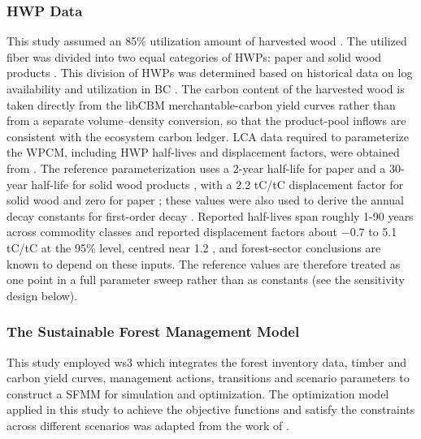 \documentclass[preprint,12pt,authoryear]{elsarticle}
\begin{document}
\begin{linenumbers}
\subsubsection{HWP Data}
This study assumed an 85\% utilization amount of harvested wood \citep{smyth2020climate}. The utilized fiber was divided into two equal categories of \acp{HWP}: paper and solid wood products \citep{ipcc2019refinement}. This division of \acp{HWP} was determined based on historical data on log availability and utilization in \ac{BC} \cite{BC_Mill_List_2020}. The carbon content of the harvested wood is taken directly from the libCBM merchantable-carbon yield curves rather than from a separate volume--density conversion, so that the product-pool inflows are consistent with the ecosystem carbon ledger. 
\Ac{LCA} data required to parameterize the \ac{WPCM}, including \ac{HWP} half-lives and displacement factors, were obtained from \cite{smyth2020climate}. The reference parameterization uses a 2-year half-life for paper and a 30-year half-life for solid wood products \citep{eggleston2006ipcc}, with a 2.2 tC/tC displacement factor for solid wood and zero for paper \citep{smyth2020climate}; these values were also used to derive the annual decay constants for first-order decay \citep{eggleston2006ipcc}. Reported half-lives span roughly 1-90 years across commodity classes \citep{ipcc2019refinement} and reported displacement factors about $-0.7$ to 5.1 tC/tC at the 95\% level, centred near 1.2 \citep{leskinen2018}, and forest-sector conclusions are known to depend on these inputs. The reference values are therefore treated as one point in a full parameter sweep rather than as constants (see the sensitivity design below).

\subsubsection{The Sustainable Forest Management Model}
\label{sec: modeling}
This study employed \ac{ws3} which integrates the forest inventory data, timber and carbon yield curves, management actions, transitions and scenario parameters to construct a \ac{SFMM} for simulation and optimization. The optimization model applied in this study to achieve the objective functions and satisfy the constraints across different scenarios was adapted from the work of \citep{paradis2013risk}. 


\end{linenumbers}
\end{document}
